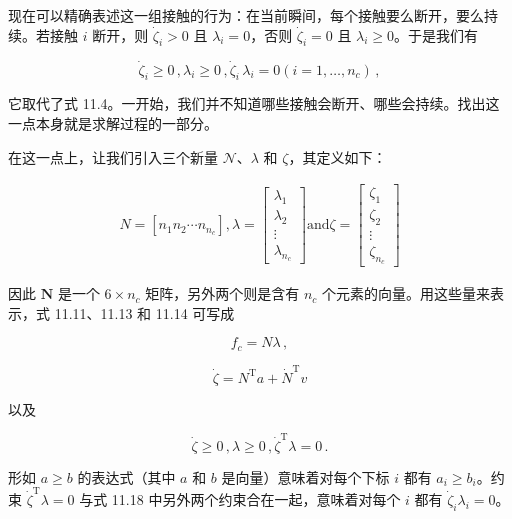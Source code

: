 \documentclass[10pt,a4paper]{book}
\theoremstyle{thmstyle} %
\theoremstyle{defstyle} %
\theoremstyle{prostyle} %
\begin{document}
现在可以精确表述这一组接触的行为：在当前瞬间，每个接触要么断开，要么持续。若接触 $i$ 断开，则 $\dot{\zeta}_i > 0$ 且 $\lambda_i = 0$，否则 $\dot{\zeta}_i = 0$ 且 $\lambda_i \geq 0$。于是我们有



$$
\dot { \zeta } _ { i } \geq 0 \, ,  \lambda _ { i } \geq 0 \, ,  \dot { \zeta } _ { i } \, \lambda _ { i } = 0  ( i = 1 , \ldots , n _ { c } ) \, ,
$$



它取代了式 11.4。一开始，我们并不知道哪些接触会断开、哪些会持续。找出这一点本身就是求解过程的一部分。



在这一点上，让我们引入三个新量 $\mathcal{N}$、$\lambda$ 和 $\zeta$，其定义如下：



$$
\begin{array}{r} { N = \left[ n _ { 1 }  n _ { 2 }  \cdots  n _ { n _ { c } } \right] ,  \lambda = \left[ \begin{array}{l} { \lambda _ { 1 } } \\{ \lambda _ { 2 } } \\{ \vdots } \\{ \lambda _ { n _ { c } } } \end{array} \right]  \mathrm { a n d }  \zeta = \left[ \begin{array}{l} { \zeta _ { 1 } } \\{ \zeta _ { 2 } } \\{ \vdots } \\{ \zeta _ { n _ { c } } } \end{array} \right] } \end{array}
$$



因此 $\mathbf{N}$ 是一个 $6 \times n_{c}$ 矩阵，另外两个则是含有 $n_{c}$ 个元素的向量。用这些量来表示，式 11.11、11.13 和 11.14 可写成



$$
f _ { c } = N \lambda \, ,
$$



$$
\dot { \zeta } = N ^{\mathrm { T} } a + \dot { N } ^{\mathrm { T} } v
$$



以及



$$
\dot { \zeta } \geq 0 \, ,  \lambda \geq 0 \, ,  \dot { \zeta } ^{\mathrm { T} } \lambda = 0 \, .
$$



形如 $a \geq b$ 的表达式（其中 $a$ 和 $b$ 是向量）意味着对每个下标 $i$ 都有 $a_i \geq b_i$。约束 $\dot{\zeta}^{\text{T}}\lambda = 0$ 与式 11.18 中另外两个约束合在一起，意味着对每个 $i$ 都有 $\dot{\zeta}_i \lambda_i = 0$。
\end{document}
